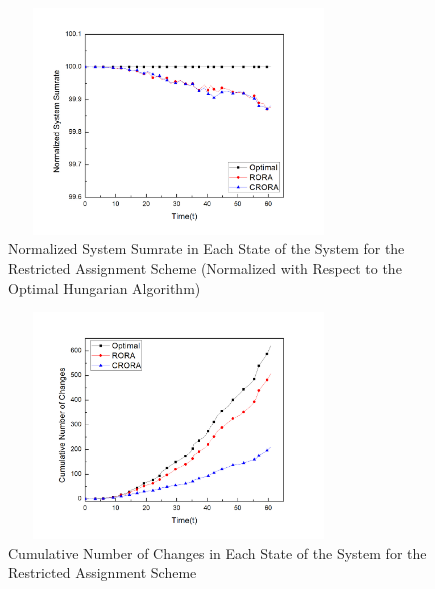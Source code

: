 \documentclass[times]{dacauth}
\begin{document}
\begin{figure}[t]
	{ %
		\setlength{\fboxsep}{1.5pt}%
		\setlength{\fboxrule}{1.5pt}%
		\centering
		\includegraphics[width=90mm,height=60mm]{Graph/Normalizedsumrateresjournal.jpg}
		\vspace{-0.2cm}
		\caption{Normalized System Sumrate in Each State of the System for the Restricted Assignment Scheme (Normalized with Respect to the Optimal Hungarian Algorithm)} \label{fig:sum_r_N}
	}
	\vspace{-.5cm}
\end{figure}

\begin{figure}[t]
	{ %
		\setlength{\fboxsep}{1.5pt}%
		\setlength{\fboxrule}{1.5pt}%
		\centering
		\includegraphics[width=90mm,height=60mm]{Graph/nocresJournal.jpg}
		\vspace{-0.2cm}
		\caption{Cumulative Number of Changes in Each State of the System for the Restricted Assignment Scheme} \label{fig:noc_r}
		\vspace{-.5cm}
	}
\end{figure}
\end{document}
